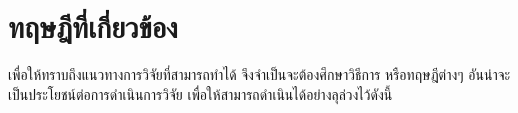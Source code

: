 \section{ทฤษฎีที่เกี่ยวข้อง} 

เพื่อให้ทราบถึงแนวทางการวิจัยที่สามารถทำได้ จึงจำเป็นจะต้องศึกษาวิธีการ หรือทฤษฎีต่างๆ อันน่าจะเป็นประโยชน์ต่อการดำเนินการวิจัย
เพื่อให้สามารถดำเนินได้อย่างลุล่วงไว้ดังนี้





% 
